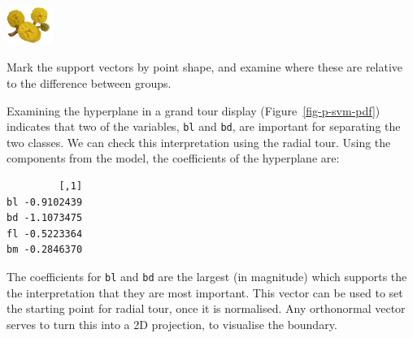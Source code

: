 \documentclass[
  letterpaper,
]{krantz}
\newenvironment{Shaded}{\begin{snugshade}}{\end{snugshade}}
\newcommand{\DecValTok}[1]{\textcolor[rgb]{0.68,0.00,0.00}{#1}}
\newcommand{\FunctionTok}[1]{\textcolor[rgb]{0.28,0.35,0.67}{#1}}
\newcommand{\NormalTok}[1]{\textcolor[rgb]{0.00,0.23,0.31}{#1}}
\newcommand{\OtherTok}[1]{\textcolor[rgb]{0.00,0.23,0.31}{#1}}
\newcommand{\SpecialCharTok}[1]{\textcolor[rgb]{0.37,0.37,0.37}{#1}}
\newcommand{\infobox}[1]{%
\noindent\colorbox{info!30}{%
\begin{minipage}{0.98\linewidth}%
    \centering%
    \begin{minipage}[c]{0.15\linewidth} %
      \includegraphics[width=1.5cm]{images/mulga-flowers2.png} %
    \end{minipage}%
    \hfill %
    \begin{minipage}[c]{0.8\linewidth} %
      \bigskip%
      \textsf{#1}%
      \bigskip%
    \end{minipage}%
    \hspace*{3mm}%
  \end{minipage}%
}%
}
\begin{document}

\infobox{Mark the support vectors by point shape, and examine where these are relative to the difference between groups.
}

Examining the hyperplane in a grand tour display
(Figure~\ref{fig-p-svm-pdf}) indicates that two of the variables,
\texttt{bl} and \texttt{bd}, are important for separating the two
classes. We can check this interpretation using the radial tour. Using
the components from the model, the coefficients of the hyperplane are:

\begin{Shaded}
\end{Shaded}

\begin{verbatim}
         [,1]
bl -0.9102439
bd -1.1073475
fl -0.5223364
bm -0.2846370
\end{verbatim}

The coefficients for \texttt{bl} and \texttt{bd} are the largest (in
magnitude) which supports the the interpretation that they are most
important. This vector can be used to set the starting point for radial
tour, once it is normalised. Any orthonormal vector serves to turn this
into a 2D projection, to visualise the boundary.

\begin{Shaded}
\end{Shaded}
\end{document}
